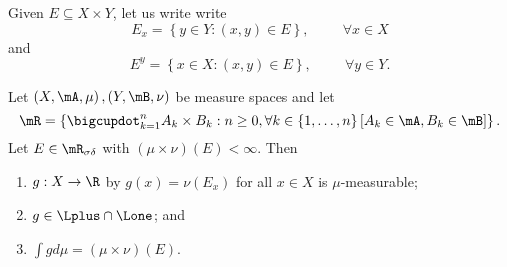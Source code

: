 \documentclass[pmath451]{subfiles}
\begin{document}
    \rruleline
    
    \np Given $E\subseteq X\times Y$, let us write write
    \begin{equation*}
        E_x = \left\lbrace y\in Y: \left( x,y \right)\in E \right\rbrace, \hspace{1cm}\forall x\in X
    \end{equation*}
    and
    \begin{equation*}
        E^y = \left\lbrace x\in X: \left( x,y \right)\in E \right\rbrace,\hspace{1cm}\forall y\in Y.
    \end{equation*}

    \begin{lemma}{}
        Let $\left( X,\mA,\mu \right),\left( Y,\mB,\nu \right)$ be measure spaces and let
        \begin{equation*}
            \mR = \left\lbrace \bigcupdot^{n}_{k=1}A_k\times B_k : n\geq 0, \forall k\in\left\lbrace 1,\ldots,n \right\rbrace\left[ A_k\in\mA,B_k\in\mB \right] \right\rbrace.
        \end{equation*}
        Let $E\in\mR_{\sigma\delta}$ with $\left( \mu\times\nu \right)\left( E \right) < \infty$. Then
        \begin{enumerate}
            \item $g:X\to\R$ by $g\left( x \right) = \nu\left( E_x \right)$ for all $x\in X$ is $\mu$-measurable;
            \item $g\in\Lplus\cap\Lone$; and
            \item $\int gd\mu = \left( \mu\times\nu \right)\left( E \right)$.
        \end{enumerate}
    \end{lemma}
    
\end{document}
